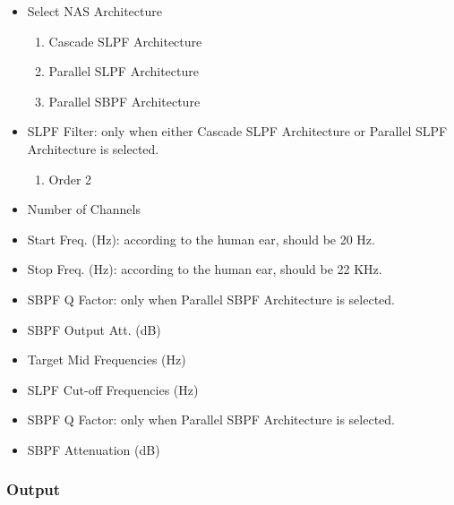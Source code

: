 \begin{itemize}
    \item Select NAS Architecture
        \begin{enumerate}
            \item Cascade SLPF Architecture
            
            \item Parallel SLPF Architecture
            
            \item Parallel SBPF Architecture
            
        \end{enumerate}
    
    \item SLPF Filter: only when either Cascade SLPF Architecture or Parallel SLPF Architecture is selected.
        \begin{enumerate}
            \item Order 2
        \end{enumerate}
    
    \item Number of Channels
    
    \item Start Freq. (Hz): according to the human ear, should be 20 Hz.
    
    \item Stop Freq. (Hz): according to the human ear, should be 22 KHz.
    
    \item SBPF Q Factor: only when Parallel SBPF Architecture is selected.
    
    \item SBPF Output Att. (dB)
    
    \item Target Mid Frequencies (Hz)
    
    \item SLPF Cut-off Frequencies (Hz)
    
    \item SBPF Q Factor: only when Parallel SBPF Architecture is selected.
    
    \item SBPF Attenuation (dB)
    
\end{itemize}

\subsubsection{Output}

